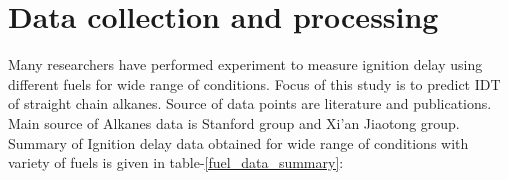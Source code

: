 \documentclass[preprint,12pt]{elsarticle}
\begin{document}
		\section{Data collection and processing} \label{S:2}
		Many researchers have performed experiment to measure ignition delay using different fuels for wide range of conditions. Focus of this study is to predict IDT of straight chain alkanes. Source of data points are literature and publications. Main source of Alkanes data is Stanford group and Xi’an Jiaotong group.  Summary of Ignition delay data obtained for wide range of conditions with variety of fuels is given in table-\ref{fuel_data_summary}:
		\begin{table}[]
			\centering
			\small{\small{
					}}
\end{table}
\end{document}
